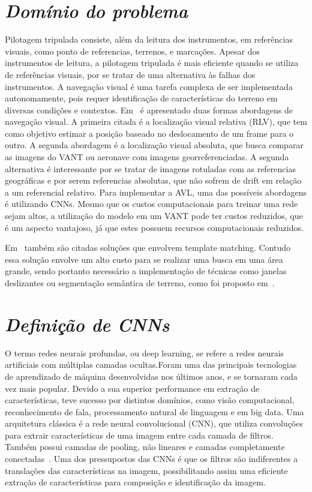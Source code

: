 

\section{\textit{Domínio do problema}}\label{sec:Cap2_MR}

Pilotagem tripulada consiste, além da leitura dos instrumentos, em referências visuais, como ponto de referencias, terrenos, e marcações. Apesar dos instrumentos de leitura, a pilotagem tripulada é mais eficiente quando se utiliza de referências visuais, por se tratar de uma alternativa às falhas dos instrumentos. A navegação visual é uma tarefa complexa de ser implementada autonomamente, pois requer identificação de características do terreno em diversas condições e contextos. Em~\cite{COUTURIER2021103666} é apresentado duas formas abordagens de navegação visual. A primeira citada é a localização visual relativa (RLV), que tem como objetivo estimar a posição baseado no deslocamento de um frame para o outro. A segunda abordagem é a localização visual absoluta, que busca comparar as imagens do VANT ou aeronave com imagens georreferenciadas. A segunda alternativa é interessante por se tratar de imagens rotuladas com as referencias geográficas e por serem referencias absolutas, que não sofrem de drift em relação a um referencial relativo. Para implementar a AVL, uma das possíveis abordagens é utilizando CNNs. Mesmo que os custos computacionais para treinar uma rede sejam altos, a utilização do modelo em um VANT pode ter custos reduzidos, que é um aspecto vantajoso, já que estes possuem recursos computacionais reduzidos.

Em~\cite{COUTURIER2021103666} também são citadas soluções que envolvem template matching. Contudo essa solução envolve um alto custo para se realizar uma busca em uma área grande, sendo portanto necessário a implementação de técnicas como janelas deslizantes ou segmentação semântica de terreno, como foi proposto em~\cite{9552597}. 
\section{\textit{Definição de CNNs}}\label{sec:Cap2_MR}

O termo redes neurais profundas, ou deep learning, se refere a redes neurais artificiais com múltiplas camadas ocultas.Foram uma das principais tecnologias de aprendizado de máquina desenvolvidas nos últimos anos, e se tornaram cada vez mais popular. Devido a sua superior performance em extração de características, teve sucesso por distintos domínios, como visão computacional, reconhecimento de fala, processamento natural de linguagem e em big data. Uma arquitetura clássica é a rede neural convolucional (CNN), que utiliza convoluções para extrair características de uma imagem entre cada camada de filtros. Também possui camadas de pooling, não lineares e camadas completamente conectadas~\cite{8308186}. Uma dos pressupostos das CNNs é que os filtros são indiferentes a translações das características na imagem, possibilitando assim uma eficiente extração de características para composição e identificação da imagem.


